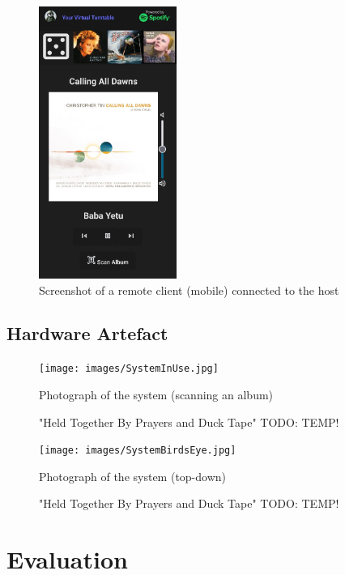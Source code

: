             \begin{figure}[h]
                \centering
                \includegraphics[width=0.4\textwidth]{images/screenshots/PHONE.jpg}
                \caption{Screenshot of a remote client (mobile) connected to the host}
                \label{fig:phone}
            \end{figure}
        
        \subsection{Hardware Artefact}
    
            \begin{figure}
                \centering
                \texttt{[image: images/SystemInUse.jpg]}
                \caption{Photograph of the system (scanning an album)}
                \label{fig:SystemInUse}
                \caption*{"Held Together By Prayers and Duck Tape" TODO: TEMP!}
            \end{figure}
    
            \begin{figure}
                \centering
                \texttt{[image: images/SystemBirdsEye.jpg]}
                \caption{Photograph of the system (top-down)}
                \label{fig:SystemTopDown}
                \caption*{"Held Together By Prayers and Duck Tape" TODO: TEMP!}
            \end{figure}
    
    \section{Evaluation}
    
